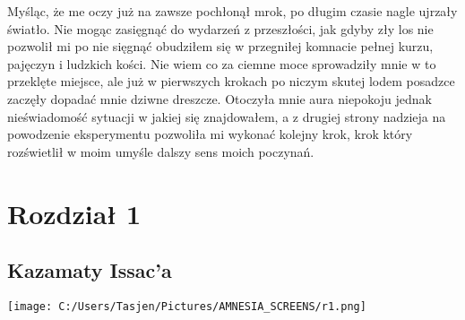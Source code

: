 \documentclass[12pt,a4paper]{report}
\begin{document}
Myśląc, że me oczy już na zawsze pochłonął mrok, po długim czasie nagle ujrzały światło. Nie mogąc zasięgnąć do wydarzeń z przeszłości, jak gdyby zły los nie pozwolił mi po nie sięgnąć obudziłem się w przegniłej komnacie pełnej kurzu, pajęczyn i ludzkich kości. Nie wiem co za ciemne moce sprowadziły mnie w to przeklęte miejsce, ale już w pierwszych krokach po niczym skutej lodem posadzce zaczęły dopadać mnie dziwne dreszcze. Otoczyła mnie aura niepokoju jednak nieświadomość sytuacji w jakiej się znajdowałem, a z drugiej strony nadzieja na powodzenie eksperymentu pozwoliła mi wykonać kolejny krok, krok który rozświetlił w moim umyśle dalszy sens moich poczynań.   
 
\section{\textbf{Rozdział 1}}
\subsection{Kazamaty Issac'a}
\begin{center}
\texttt{[image: C:/Users/Tasjen/Pictures/AMNESIA\_SCREENS/r1.png]}\\
\end{center}
\end{document}
